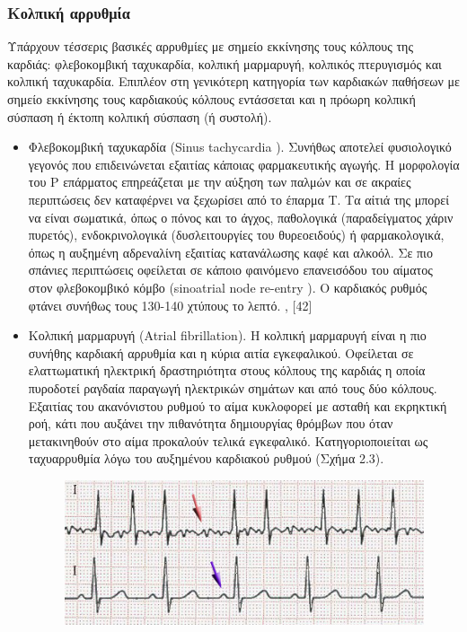 \subsubsection{Κολπική αρρυθμία} 
Υπάρχουν τέσσερις βασικές αρρυθμίες με σημείο εκκίνησης τους κόλπους της καρδιάς: φλεβοκομβική ταχυκαρδία, κολπική μαρμαρυγή, κολπικός πτερυγισμός και κολπική ταχυκαρδία. Επιπλέον στη γενικότερη κατηγορία των καρδιακών παθήσεων με σημείο εκκίνησης τους καρδιακούς κόλπους εντάσσεται και η πρόωρη κολπική σύσπαση ή έκτοπη κολπική σύσπαση (ή συστολή).
\begin{itemize}
	\item Φλεβοκομβική ταχυκαρδία (\en Sinus tachycardia \gr). Συνήθως αποτελεί φυσιολογικό γεγονός που επιδεινώνεται εξαιτίας κάποιας φαρμακευτικής αγωγής. Η μορφολογία του Ρ επάρματος επηρεάζεται με την αύξηση των παλμών και σε ακραίες περιπτώσεις δεν καταφέρνει να ξεχωρίσει από το έπαρμα Τ.  Τα αίτιά της μπορεί να είναι σωματικά, όπως ο πόνος και το άγχος, παθολογικά (παραδείγματος χάριν πυρετός), ενδοκρινολογικά (δυσλειτουργίες του θυρεοειδούς) ή φαρμακολογικά, όπως η αυξημένη αδρεναλίνη εξαιτίας κατανάλωσης καφέ και αλκοόλ. Σε πιο σπάνιες περιπτώσεις οφείλεται σε κάποιο φαινόμενο επανεισόδου του αίματος στον φλεβοκομβικό κόμβο (\en sinoatrial node re-entry \gr).  Ο καρδιακός ρυθμός φτάνει συνήθως τους 130-140 χτύπους το λεπτό.  \en [26], [42]  \gr
	\item Κολπική μαρμαρυγή \en (Atrial fibrillation). \gr Η κολπική μαρμαρυγή είναι η πιο συνήθης καρδιακή αρρυθμία και η κύρια αιτία εγκεφαλικού. Οφείλεται σε ελαττωματική ηλεκτρική δραστηριότητα στους κόλπους της καρδιάς η οποία πυροδοτεί ραγδαία παραγωγή ηλεκτρικών σημάτων και από τους δύο κόλπους. Εξαιτίας του ακανόνιστου ρυθμού το αίμα κυκλοφορεί με ασταθή και εκρηκτική ροή, κάτι που αυξάνει την πιθανότητα δημιουργίας θρόμβων που όταν μετακινηθούν στο αίμα προκαλούν τελικά εγκεφαλικό. Κατηγοριοποιείται ως ταχυαρρυθμία λόγω του αυξημένου καρδιακού ρυθμού (Σχήμα 2.3). \par
	\begin{figure}[h]
		\centering
		\includegraphics[scale=0.5]{Afib_ecg.jpg}

\end{figure}
\end{itemize}
